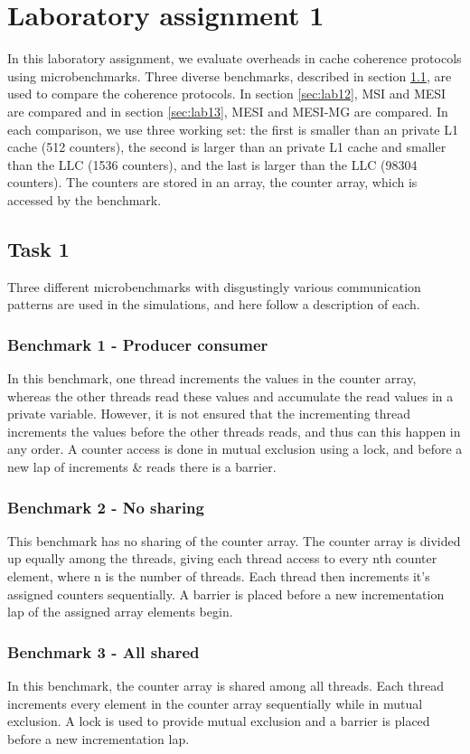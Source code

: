 \section{Laboratory assignment 1}
\label{sec:lab1}
In this laboratory assignment, we evaluate overheads in cache coherence protocols using microbenchmarks. Three diverse benchmarks, described in section \ref{sec:lab11}, are used to compare the coherence protocols. In section \ref{sec:lab12}, MSI and MESI are compared and in section \ref{sec:lab13}, MESI and MESI-MG are compared. In each comparison, we use three working set: the first is smaller than an private L1 cache (512 counters), the second is larger than an private L1 cache and smaller than the LLC (1536 counters), and the last is larger than the LLC (98304 counters). The counters are stored in an array, the counter array, which is accessed by the benchmark.

\subsection{Task 1}
\label{sec:lab11}
Three different microbenchmarks with disgustingly various communication patterns are used in the simulations, and here follow a description of each.
\subsubsection*{Benchmark 1 - Producer consumer}
In this benchmark, one thread increments the values in the counter array, whereas the other threads read these values and accumulate the read values in a private variable. However, it is not ensured that the incrementing thread increments the values before the other threads reads, and thus can this happen in any order. A counter access is done in mutual exclusion using a lock, and before a new lap of increments \& reads there is a barrier.

\subsubsection*{Benchmark 2 - No sharing}
This benchmark has no sharing of the counter array. The counter array is divided up equally among the threads, giving each thread access to every nth counter element, where n is the number of threads. Each thread then increments it's assigned counters sequentially. A barrier is placed before a new incrementation lap of the assigned array elements begin. 

\subsubsection*{Benchmark 3 - All shared}
In this benchmark, the counter array is shared among all threads. Each thread increments every element in the counter array sequentially while in mutual exclusion. A lock is used to provide mutual exclusion and a barrier is placed before a new incrementation lap. 

